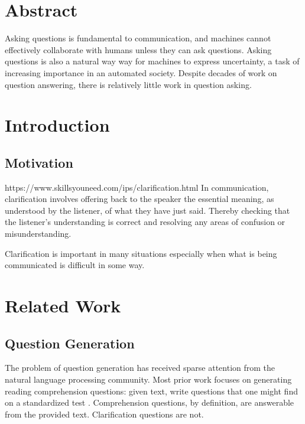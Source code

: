 \documentclass[11pt]{article}
\begin{document}
\section{Abstract}

Asking questions is fundamental to communication, and machines cannot effectively collaborate with humans unless they can ask questions. Asking questions is also a natural way way for machines to express uncertainty, a task of increasing importance in an automated society. Despite decades of work on question answering, there is relatively little work in question asking.

\section{Introduction}

\subsection{Motivation}
https://www.skillsyouneed.com/ips/clarification.html
In communication, clarification involves offering back to the speaker the essential meaning, as understood by the listener, of what they have just said. Thereby checking that the listener's understanding is correct and resolving any areas of confusion or misunderstanding.

Clarification is important in many situations especially when what is being communicated is difficult in some way.


\section{Related Work}

\subsection{Question Generation}

The problem of question generation has received sparse attention from the natural language processing community. Most prior work focuses on generating reading comprehension questions:  given text, write questions that one might find on a standardized test \cite{vanderwende2008importance,heilman2011automatic,rus2011question,olney2012question}.  Comprehension questions, by definition, are answerable from the provided text. Clarification questions are not.  
\end{document}
